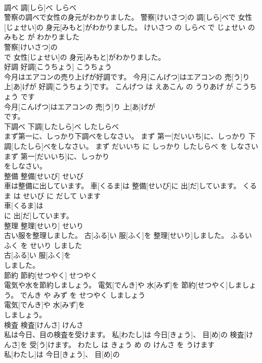 \documentclass[8pt]{extreport}
\begin{document}
\begin{CJK}{UTF8}{min}
\\	調べ	調[しら]べ	しらべ	
\\	警察の調べで女性の身元がわかりました。	警察[けいさつ]の 調[しら]べで 女性[じょせい]の 身元[みもと]がわかりました。	けいさつ の しらべ で じょせい の みもと が わかりました	
\\	警察[けいさつ]の
\\	で 女性[じょせい]の 身元[みもと]がわかりました。			
\\	好調	好調[こうちょう]	こうちょう	
\\	今月はエアコンの売り上げが好調です。	今月[こんげつ]はエアコンの 売[う]り 上[あ]げが 好調[こうちょう]です。	こんげつ は えあこん の うりあげ が こうちょう です	
\\	今月[こんげつ]はエアコンの 売[う]り 上[あ]げが
\\	です。			
\\	下調べ	下調[したしら]べ	したしらべ	
\\	まず第一に、しっかり下調べをしなさい。	まず 第一[だいいち]に、しっかり 下調[したしら]べをしなさい。	まず だいいち に しっかり したしらべ を しなさい	
\\	まず 第一[だいいち]に、しっかり
\\	をしなさい。			
\\	整備	整備[せいび]	せいび	
\\	車は整備に出しています。	車[くるま]は 整備[せいび]に 出[だ]しています。	くるま は せいび に だして います	
\\	車[くるま]は
\\	に 出[だ]しています。			
\\	整理	整理[せいり]	せいり	
\\	古い服を整理しました。	古[ふる]い 服[ふく]を 整理[せいり]しました。	ふるい ふく を せいり しました	
\\	古[ふる]い 服[ふく]を
\\	しました。			
\\	節約	節約[せつやく]	せつやく	
\\	電気や水を節約しましょう。	電気[でんき]や 水[みず]を 節約[せつやく]しましょう。	でんき や みず を せつやく しましょう	
\\	電気[でんき]や 水[みず]を
\\	しましょう。			
\\	検査	検査[けんさ]	けんさ	
\\	私は今日、目の検査を受けます。	私[わたし]は 今日[きょう]、 目[め]の 検査[けんさ]を 受[う]けます。	わたし は きょう め の けんさ を うけます	
\\	私[わたし]は 今日[きょう]、 目[め]の

\end{CJK}
\end{document}
